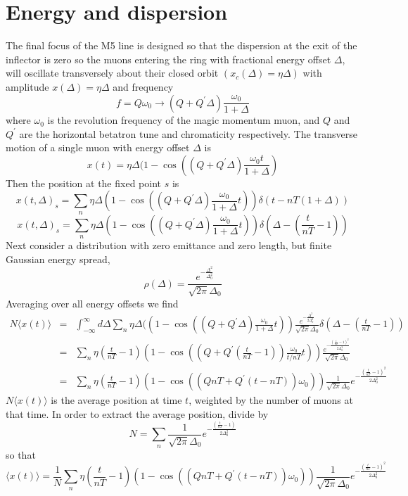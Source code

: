 \documentclass[10pt]{report}
\begin{document}
\section*{Energy and dispersion}
The final focus of the M5 line is designed so that the dispersion at the
exit of the inflector is zero\cite{rubin} so the muons entering the ring with fractional energy offset $\Delta$, 
will oscillate transversely about their closed orbit $(x_c(\Delta)=\eta\Delta)$ with 
amplitude $x(\Delta)=\eta\Delta$ and frequency 
$$ f=Q\omega_0 \rightarrow (Q+Q^\prime\Delta)\frac{\omega_0}{1+\Delta}$$
where $\omega_0$ is the revolution frequency of the magic momentum muon, and $Q$ and $Q^\prime$ are the
horizontal betatron tune and chromaticity respectively.
The transverse motion of a single muon with energy offset $\Delta$ is
$$x(t) = \eta\Delta(1-\cos\left((Q+Q^\prime\Delta)\frac{\omega_0 t}{1+\Delta} \right)$$
Then the position at the fixed point $s$ is
$$x(t,\Delta)_s = \sum_n\eta\Delta\left(1-\cos\left( (Q+Q^\prime\Delta)\frac{\omega_0}{1+\Delta}   t\right)\right)\delta(t-nT(1+\Delta))$$
$$x(t,\Delta)_s = \sum_n\eta\Delta\left(1-\cos\left((Q+Q^\prime\Delta)\frac{\omega_0}{1+\Delta} t\right)\right)\delta(\Delta - (\frac{t}{nT}-1))$$
Next consider a distribution with zero emittance and zero length, but finite Gaussian energy spread,
$$\rho(\Delta) = \frac{e^{-\frac{\Delta^2}{\Delta_0^2}}}{\sqrt{2\pi}\Delta_0}$$ 
Averaging over all energy offsets we find
\begin{eqnarray*}
N\langle x(t)\rangle &=&
\int_{-\infty}^\infty d\Delta\sum_n\eta\Delta(\left(1-\cos\left((Q+Q^\prime\Delta)\frac{\omega_0}{1+\Delta} t\right)\right)\frac{e^{-\frac{\Delta^2}{2\Delta_0^2}}}{\sqrt{2\pi}\Delta_0}\delta(\Delta-(\frac{t}{nT}-1))\\
&=&
\sum_n\eta(\frac{t}{nT}-1)\left(1-\cos\left((Q+ Q^\prime(\frac{t}{nT}-1))\frac{\omega_0}{t/nT} t\right)\right)\frac{e^{-\frac{(\frac{t}{nT}-1)^2}{2\Delta_0^2}}}{\sqrt{2\pi}\Delta_0}\\
&=&\sum_n\eta(\frac{t}{nT}-1)\left(1-\cos\left((QnT+ Q^\prime(t-nT))\omega_0 \right)\right)\frac{1}{\sqrt{2\pi}\Delta_0}e^{-\frac{(\frac{t}{nT}-1)^2}{2\Delta_0^2}}
\end{eqnarray*}
$N\langle x(t)\rangle$ is the average position at time $t$, weighted by the number of muons at that time.
In order to extract the average position, divide by
$$N = \sum_n \frac{1}{\sqrt{2\pi}\Delta_0}e^{-\frac{(\frac{t}{nT}-1)}{2\Delta_0^2}}$$
so that
\begin{equation}
\langle x(t)\rangle = \frac{1}{N}
\sum_n\eta(\frac{t}{nT}-1)\left(1-\cos\left((QnT+ Q^\prime(t-nT))\omega_0 \right)\right)\frac{1}{\sqrt{2\pi}\Delta_0}e^{-\frac{(\frac{t}{nT}-1)^2}{2\Delta_0^2}}\label{eq:averagex}
\end{equation}
\end{document}
